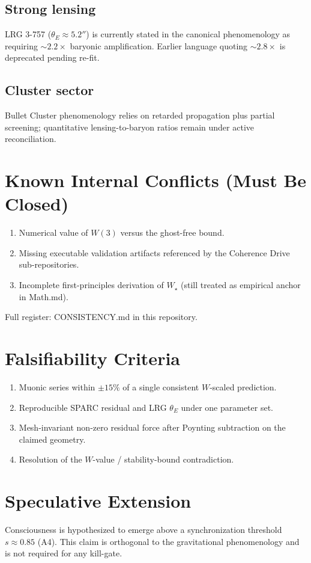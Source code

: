 \documentclass[11pt]{article}
\begin{document}
\subsection{Strong lensing}
LRG 3-757 ($\theta_E\approx 5.2''$) is currently stated in the canonical phenomenology as requiring $\sim 2.2\times$ baryonic amplification. Earlier language quoting $\sim 2.8\times$ is deprecated pending re-fit.

\subsection{Cluster sector}
Bullet Cluster phenomenology relies on retarded propagation plus partial screening; quantitative lensing-to-baryon ratios remain under active reconciliation.

\section{Known Internal Conflicts (Must Be Closed)}
\begin{enumerate}
    \item Numerical value of $W(3)$ versus the ghost-free bound.
    \item Missing executable validation artifacts referenced by the Coherence Drive sub-repositories.
    \item Incomplete first-principles derivation of $W_\star$ (still treated as empirical anchor in Math.md).
\end{enumerate}
Full register: CONSISTENCY.md in this repository.

\section{Falsifiability Criteria}
\begin{enumerate}
    \item Muonic series within $\pm 15\%$ of a single consistent $W$-scaled prediction.
    \item Reproducible SPARC residual and LRG $\theta_E$ under one parameter set.
    \item Mesh-invariant non-zero residual force after Poynting subtraction on the claimed geometry.
    \item Resolution of the $W$-value / stability-bound contradiction.
\end{enumerate}

\section{Speculative Extension}
Consciousness is hypothesized to emerge above a synchronization threshold $s\approx 0.85$ (A4). This claim is orthogonal to the gravitational phenomenology and is not required for any kill-gate.
\end{document}
